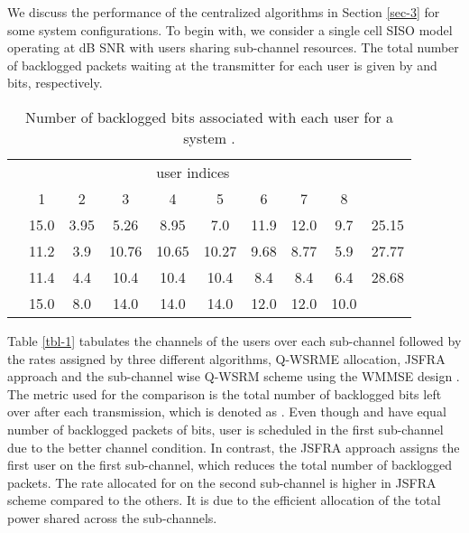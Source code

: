 We discuss the performance of the centralized algorithms in Section \ref{sec-3} for some system configurations. To begin with, we consider a single cell \ac{SISO} model operating at  dB \ac{SNR} with  users sharing  sub-channel resources. The total number of backlogged packets waiting at the transmitter for each user is given by  and  bits, respectively. 
\begin{table}
	\centering
	\caption{Number of backlogged bits associated with each user for a system .}
	\renewcommand{\arraystretch}{1.25} \scriptsize
	\begin{tabular}{|c|*{8}{c}|c|}
		\hline
		\multirow{2}{*}{\me{q}} & \multicolumn{8}{c|}{user indices} & \multirow{2}{*}{\me{\chi}} \\
		\cline{2-9}
		& 1 & 2 & 3 & 4 & 5 & 6 & 7 & 8 & \\
		\hline
		\hline
		\me{1} & 15.0 & 3.95 & 5.26 & 8.95 & 7.0 & 11.9 & 12.0 & 9.7 & 25.15 \\
		\me{2} & 11.2 & 3.9 & 10.76 & 10.65 & 10.27 & 9.68 & 8.77 & 5.9 & 27.77 \\
		\me{\infty} & 11.4 & 4.4 & 10.4 & 10.4 & 10.4 & 8.4 &  8.4 &  6.4 & 28.68 \\
		\hline
		\me{Q_k}  & 15.0 &  8.0 &  14.0 & 14.0 &  14.0 & 12.0 & 12.0 & 10.0  \\
		\cline{1-9}
	\end{tabular}
	\label{tbl-3}
\end{table}

Table \ref{tbl-1} tabulates the channels of the users over each sub-channel followed by the rates assigned by three different algorithms, \ac{Q-WSRME} allocation, \ac{JSFRA} approach and the sub-channel wise \ac{Q-WSRM} scheme using the \ac{WMMSE} design \cite{wmmse_shi}. The metric used for the comparison is the total number of backlogged bits left over after each transmission, which is denoted as . Even though  and  have equal number of backlogged packets of  bits, user  is scheduled in the first sub-channel due to the better channel condition. In contrast, the \ac{JSFRA} approach assigns the first user on the first sub-channel, which reduces the total number of backlogged packets. The rate allocated for  on the second sub-channel is higher in \ac{JSFRA} scheme compared to the others. It is due to the efficient allocation of the total power shared across the sub-channels.

